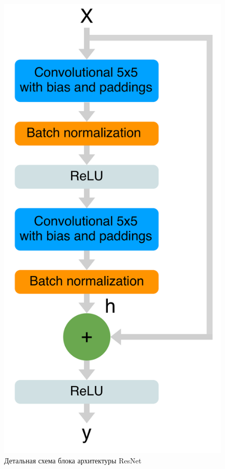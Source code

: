 \begin{figure}[h!]
	\centering
	\includegraphics[width=\textwidth / 3]{img/resnet_classic}
	\caption{Детальная схема блока архитектуры ResNet} 
	\label{fig:detail_resnet_block}
\end{figure}

